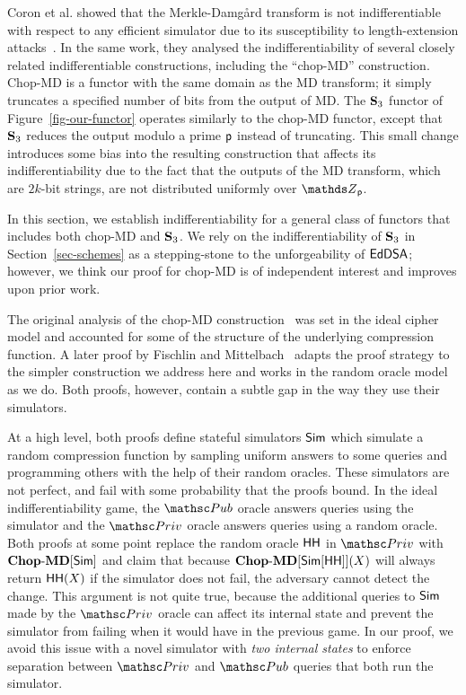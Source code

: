 Coron et al. showed that the Merkle-Damg{\aa}rd transform is not indifferentiable with respect to
any efficient simulator due to its susceptibility to length-extension attacks~\cite{C:CDMP05}.
In the same work, they analysed the indifferentiability of several closely related indifferentiable constructions, including the ``chop-MD'' construction.
Chop-MD is a functor with the same domain as the MD transform; it simply truncates a specified number of bits from the output of MD.
The $\mathbf{S}_3$ functor of Figure~\ref{fig-our-functor} operates similarly to the chop-MD functor, except that $\mathbf{S}_3$ reduces the output modulo a prime $\mathsf{p}$ instead of truncating.
This small change introduces some bias into the resulting construction that affects its indifferentiability due to the fact that the outputs of the MD transform, which are $2k$-bit strings, are not distributed uniformly over $\Z_{\Prime}$.

In this section, we establish indifferentiability for a general class of functors that includes both chop-MD and $\mathbf{S}_3$.
We rely on the indifferentiability of $\mathbf{S}_3$ in Section~\ref{sec-schemes} as a stepping-stone to the unforgeability of $\mathsf{EdDSA}$;
however, we think our proof for chop-MD is of independent interest and improves upon prior work.

The original analysis of the chop-MD construction~\cite{C:CDMP05} was set in the ideal cipher model and
accounted for some of the structure of the underlying compression function. A later proof by Fischlin and 
Mittelbach~\cite{hfrobook} adapts the proof strategy to the simpler construction we address here and works in the random
oracle model as we do. Both proofs, however, contain a subtle gap in the way they use their simulators.

At a high level, both proofs define stateful simulators $\mathsf{Sim}$ which simulate a random compression function by
sampling uniform answers to some queries and programming others with the help of their random oracles.
These simulators are not perfect, and fail with some probability that the proofs bound.
In the ideal indifferentiability game, the $\PubO$ oracle answers queries using the simulator and the $\PrivO$ oracle
answers queries using a random oracle.
Both proofs at some point replace the random oracle $\mathsf{HH}$ in $\PrivO$ with $\mathbf{Chop\mbox{-}MD}[\mathsf{Sim}]$ and claim that
because $\mathbf{Chop\mbox{-}MD}[\mathsf{Sim}[\mathsf{HH}]](X)$ will always return $\mathsf{HH}(X)$ if the simulator does not fail, the adversary cannot detect the change.
This argument is not quite true, because the additional queries to $\mathsf{Sim}$ made by the $\PrivO$ oracle can affect its
internal state and prevent the simulator from failing when it would have in the previous game.
In our proof, we avoid this issue with a novel simulator with \textit{two internal states} to enforce separation between
$\PrivO$ and $\PubO$ queries that both run the simulator.

